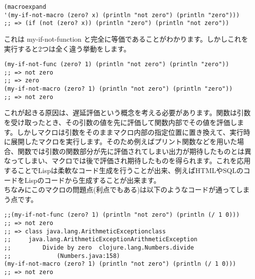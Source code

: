 \documentclass[a4paper, dvipdfmx, 12pt]{article}
\begin{document}
\begin{verbatim}
(macroexpand 
'(my-if-not-macro (zero? x) (println "not zero") (println "zero")))
;; => (if (not (zero? x)) (println "zero") (println "not zero"))
\end{verbatim}

これは my-if-not-function  と完全に等価であることがわかります。しかしこれを実行すると2つは全く違う挙動をします。\\

\begin{verbatim}
(my-if-not-func (zero? 1) (println "not zero") (println "zero"))
;; => not zero 
;; => zero
(my-if-not-macro (zero? 1) (println "not zero") (println "zero"))
;; => not zero
\end{verbatim}

これが起きる原因は、遅延評価という概念を考える必要があります。関数は引数を受け取ったとき、その引数の値を先に評価して関数内部でその値を評価します。しかしマクロは引数をそのままマクロ内部の指定位置に置き換えて、実行時に展開したマクロを実行します。そのため例えばプリント関数などを用いた場合、関数では引数の関数部分が先に評価されてしまい出力が期待したものとは異なってしまい、マクロでは後で評価され期待したものを得られます。これを応用することでLispは柔軟なコード生成を行うことが出来、例えばHTMLやSQLのコードをLispのコードから生成することが出来ます。\\

ちなみにこのマクロの問題点(利点でもある)は以下のようなコードが通ってしまう点です。\\

\begin{verbatim}
;;(my-if-not-func (zero? 1) (println "not zero") (println (/ 1 0)))
;; => not zero
;; => class java.lang.ArithmeticExceptionclass 
;;     java.lang.ArithmeticExceptionArithmeticException
;;         Divide by zero  clojure.lang.Numbers.divide 
;;             (Numbers.java:158)
(my-if-not-macro (zero? 1) (println "not zero") (println (/ 1 0)))
;; => not zero
\end{verbatim}
\end{document}
